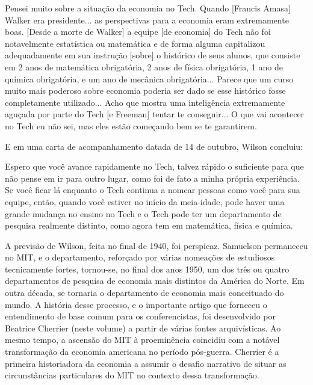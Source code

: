 \documentclass[a4paper,12pt]{article}[abntex2]
\begin{document}
Pensei muito sobre a situação da economia no Tech. Quando [Francis Amasa] Walker era presidente... as perspectivas para a economia eram extremamente boas. [Desde a morte de Walker] a equipe [de economia] do Tech não foi notavelmente estatística ou matemática e de forma alguma capitalizou adequadamente em sua instrução [sobre] o histórico de seus alunos, que consiste em 2 anos de matemática obrigatória, 2 anos de física obrigatória, 1 ano de química obrigatória, e um ano de mecânica obrigatória... Parece que um curso muito mais poderoso sobre economia poderia ser dado se esse histórico fosse completamente utilizado... Acho que mostra uma inteligência extremamente aguçada por parte do Tech [e Freeman] tentar te conseguir... O que vai acontecer no Tech eu não sei, mas eles estão começando bem se te garantirem.

E em uma carta de acompanhamento datada de 14 de outubro, Wilson concluiu:

Espero que você avance rapidamente no Tech, talvez rápido o suficiente para que não pense em ir para outro lugar, como foi de fato a minha própria experiência. Se você ficar lá enquanto o Tech continua a nomear pessoas como você para sua equipe, então, quando você estiver no início da meia-idade, pode haver uma grande mudança no ensino no Tech e o Tech pode ter um departamento de pesquisa realmente distinto, como agora tem em matemática, física e química.

A previsão de Wilson, feita no final de 1940, foi perspicaz. Samuelson permaneceu no MIT, e o departamento, reforçado por várias nomeações de estudiosos tecnicamente fortes, tornou-se, no final dos anos 1950, um dos três ou quatro departamentos de pesquisa de economia mais distintos da América do Norte. Em outra década, se tornaria o departamento de economia mais conceituado do mundo. A história desse processo, e o importante artigo que forneceu o entendimento de base comum para os conferencistas, foi desenvolvido por Beatrice Cherrier (neste volume) a partir de várias fontes arquivísticas. Ao mesmo tempo, a ascensão do MIT à proeminência coincidiu com a notável transformação da economia americana no período pós-guerra. Cherrier é a primeira historiadora da economia a assumir o desafio narrativo de situar as circunstâncias particulares do MIT no contexto dessa transformação.
\end{document}
